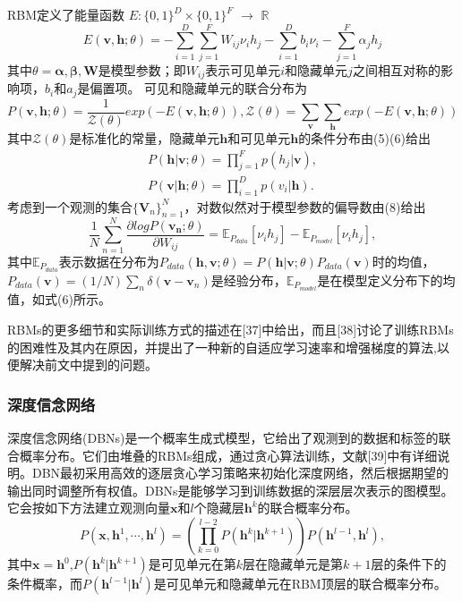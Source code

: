 \documentclass[a4paper]{article}
\begin{document}
RBM定义了能量函数
$E:\{0,1\}^{D}\times \{0,1\}^{F} $
$\to$
$ \mathbb{R}$
\begin{equation}
	E(\bm{v},\bm{h};\theta) = -\sum_{i=1}^{D}\sum_{j=1}^{F}W_{ij}\nu_{i}h_{j}-\sum_{i=1}^{D}b_{i}\nu_{i}-\sum_{j=1}^{F}\alpha_{j}h_{j}
\end{equation}
其中$\theta = {\bm{\alpha},\bm{\beta},\bm{W}}$是模型参数；即$W_{ij}$表示可见单元$i$和隐藏单元$j$之间相互对称的影响项，$b_{i}$和$a_{j}$是偏置项。
可见和隐藏单元的联合分布为
\begin{equation}
	P(\bm{v},\bm{h};\theta) = \frac{1}{\mathcal{Z}(\theta)}exp(-E(\bm{v},\bm{h};\theta)),
	\mathcal{Z}(\theta)=\sum_{\bm{v}}\sum_{\bm{h}}exp(-E(\bm{v},\bm{h};\theta))
\end{equation}
其中$\mathcal{Z}(\theta)$是标准化的常量，隐藏单元$\bm{h}$和可见单元$\bm{h}$的条件分布由(5)(6)给出
\begin{equation}
	\begin{split}
		P(\bm{h}|\bm{v};\theta) = \prod_{j=1}^{F}p(h_{j}|\bm{v}),\\
		P(\bm{v}|\bm{h};\theta) = \prod_{i=1}^{D}p(v_{i}|\bm{h}).
	\end{split}
\end{equation}
考虑到一个观测的集合$\{\bm{V}_{n}\}^{N}_{n=1}$，对数似然对于模型参数的偏导数由(8)给出
\begin{equation}
	\frac{1}{N}\sum_{n=1}^{N}\frac{\partial logP(\bm{v_{n}};\theta)}{\partial W_{ij}}=\mathbb{E}_{P_{data}}[\nu_{i}h_{j}]-\mathbb{E}_{P_{model}}[\nu_{i}h_{j}],
\end{equation}
其中$\mathbb{E}_{P_{data}}$表示数据在分布为$P_{data}(\bm{h},\bm{v};\theta)=P(\bm{h}|\bm{v};\theta)P_{data}(\bm{v})$时的均值，$P_{data}(\bm{v})=(1/N)\sum_{n}\delta(\bm{v}-\bm{v}_{n})$是经验分布，$\mathbb{E}_{P_{model}}$是在模型定义分布下的均值，如式(6)所示。

RBMs的更多细节和实际训练方式的描述在[37]中给出，而且[38]讨论了训练RBMs的困难性及其内在原因，并提出了一种新的自适应学习速率和增强梯度的算法,以便解决前文中提到的问题。

\subsubsection{深度信念网络}
深度信念网络(DBNs)是一个概率生成式模型，它给出了观测到的数据和标签的联合概率分布。它们由堆叠的RBMs组成，通过贪心算法训练，文献[39]中有详细说明。DBN最初采用高效的逐层贪心学习策略来初始化深度网络，然后根据期望的输出同时调整所有权值。DBNs是能够学习到训练数据的深层层次表示的图模型。它会按如下方法建立观测向量$\bm{x}$和$l$个隐藏层$\bm{h}^{k}$的联合概率分布。
\begin{equation}
	P(\bm{x},\bm{h}^{1},\cdots,\bm{h}^{l})=
	\left(
	\prod_{k=0}^{l-2}P(\bm{h}^{k}|\bm{h}^{k+1})
	\right)
	P(\bm{h}^{l-1},\bm{h}^{l}),
\end{equation}
其中$\bm{x}=\bm{h}^{0}$,$P(\bm{h}^{k}|\bm{h}^{k+1})$是可见单元在第$k$层在隐藏单元是第$k+1$层的条件下的条件概率，而$P(\bm{h}^{l-1}|\bm{h}^l)$是可见单元和隐藏单元在RBM顶层的联合概率分布。
\end{document}

